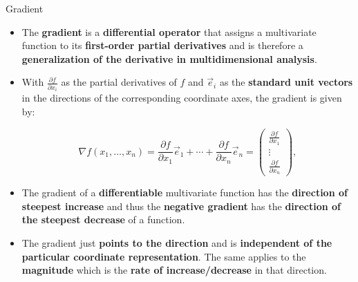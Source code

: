 \documentclass[document.tex]{subfiles}
\begin{document}
    \begin{frame}{Gradient}
        \begin{itemize}
            \item The \textbf{gradient} is a \textbf{differential operator} that assigns a multivariate function to its \textbf{first-order partial derivatives} and is therefore a \textbf{generalization of the derivative in multidimensional analysis}.
            \item With $\frac{\partial f}{\partial x_i}$ as the partial derivatives of $f$ and $\vec{e}_i$ as the \textbf{standard unit vectors} in the directions of the corresponding coordinate axes, the gradient is given by:
            
            $$\nabla f(x_1, \dots, x_n) = \frac{\partial f}{\partial x_1} \vec{e}_1 + \cdots + \frac{\partial f}{\partial x_n} \vec{e}_n = \begin{pmatrix}\frac{\partial f}{\partial x_{1}} \\ \vdots \\  \frac{\partial f}{\partial x_{n}} \end{pmatrix},$$
            
            \item The gradient of a \textbf{differentiable} multivariate function has the \textbf{direction of steepest increase} and thus the \textbf{negative gradient} has the \textbf{direction of the steepest decrease} of a function.
            \item The gradient just \textbf{points to the direction} and is \textbf{independent of the particular coordinate representation}. The same applies to the \textbf{magnitude} which is the \textbf{rate of increase/decrease} in that direction.
        \end{itemize}
    \end{frame}
\end{document}
